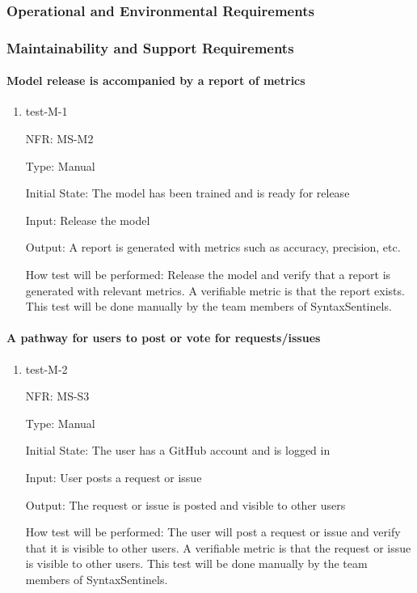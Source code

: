 \documentclass[12pt, titlepage]{article}
\begin{document}
\subsubsection{Operational and Environmental Requirements}

\subsubsection{Maintainability and Support Requirements}

\paragraph{Model release is accompanied by a report of metrics}

\begin{enumerate}

  \item{test-M-1}

  NFR: MS-M2

  Type: Manual

  Initial State: The model has been trained and is ready for release

  Input: Release the model

  Output: A report is generated with metrics such as accuracy, precision, etc.

  How test will be performed:
  Release the model and verify that a report is generated with relevant metrics. A verifiable metric is that the report exists.
  This test will be done manually by the team members of SyntaxSentinels.

\end{enumerate}

\paragraph{A pathway for users to post or vote for requests/issues}

\begin{enumerate}
  \item{test-M-2}

  NFR: MS-S3

  Type: Manual

  Initial State: The user has a GitHub account and is logged in

  Input: User posts a request or issue

  Output: The request or issue is posted and visible to other users

  How test will be performed:
  The user will post a request or issue and verify that it is visible to other users. A verifiable metric is that the request or issue is visible to other users.
  This test will be done manually by the team members of SyntaxSentinels.
\end{enumerate}
\end{document}
